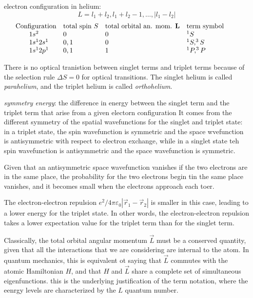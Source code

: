 \documentclass[10pt, a4paper, twocolumn]{article}
\newcommand{\deff}[1]{\par \noindent \textit{#1}: }
\newcommand{\pfs}{\ensuremath{\varepsilon _0}}
\begin{document}
electron configuration in helium:
\[ L = l_1 + l_2, l_1 + l_2 -1, \ldots, |l_1-l_2| \]
\begin{equation*}
\begin{array}{llll}
\hspace{-2em} \text{Configuration} & \text{total spin }S
& \text{total orbital an. mom. }\vb L & \text{term symbol}
\\ 1s^2 & 0 & 0 & ^1S
\\ 1s^12s^1 & 0,1 & 0 & ^1S, ^3S
\\ 1s^12p^1 & 0,1 & 1 & ^1P, ^3P
\end{array}
\end{equation*}

There is no optical tranistion between singlet terms and triplet terms because of the selection rule $\Delta S = 0$ for optical transitions. The singlet helium is called \emph{parahelium}, and the triplet helium is called \emph{orthohelium}. 

\deff{symmetry energy}
the difference in energy between the singlet term and the triplet term that arise from a given electorn configuration
It comes from the different symmetry of the spatial wavefunctions for the singlet and triplet state: in a triplet state, the spin wavefunction is symmetric and the space wvefunction is antisymmetric with respect to electron exchange, while in a singlet state teh spin wavefunction is antisymmetric and the space wavefunction is symmetric.

Given that an antisymmetric space wavefunction vanishes if the two electrons are in the same place, the probability for the two electrons begin tin the same place vanishes, and it becomes small when the electrons approach each toer. 

The electron-electron repulsion
$e^2/4 \pi \pfs |\vec r_1-\vec r_2|$
is smaller in this case, leading to a lower energy for the triplet state. In other words, the electron-electron repulsion takes a lower expectation value for the triplet term than for the singlet term.

Classically, the total orbital angular momentum $\vec L$ must be a conserved quantity, given that all the interactions that we are considering are internal to the atom. In quantum mechanics, this is equivalent ot saying that $\vec L$ commutes with the atomic Hamiltonian $H$, and that $H$ and $\vec L$ share a complete set of simultaneous eigenfunctions. this is the underlying justification of the term notation, where the eenrgy levels are characterized by the $L$ quantum number.
\end{document}
